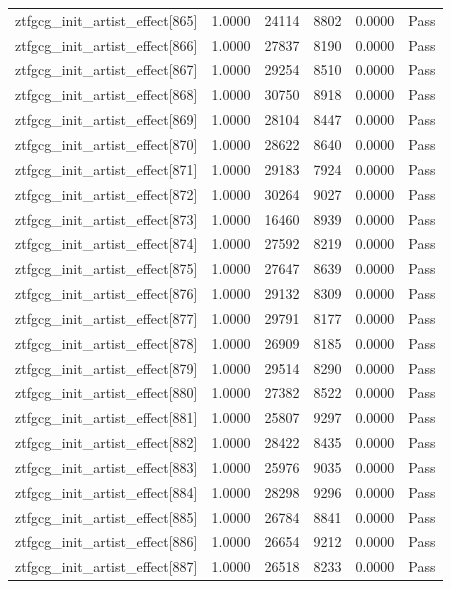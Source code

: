\begin{table}[htbp]
\begin{tabular}{llrrll}
ztfgcg\_init\_artist\_effect[865] & 1.0000 & 24114 & 8802 & 0.0000 & Pass \\
ztfgcg\_init\_artist\_effect[866] & 1.0000 & 27837 & 8190 & 0.0000 & Pass \\
ztfgcg\_init\_artist\_effect[867] & 1.0000 & 29254 & 8510 & 0.0000 & Pass \\
ztfgcg\_init\_artist\_effect[868] & 1.0000 & 30750 & 8918 & 0.0000 & Pass \\
ztfgcg\_init\_artist\_effect[869] & 1.0000 & 28104 & 8447 & 0.0000 & Pass \\
ztfgcg\_init\_artist\_effect[870] & 1.0000 & 28622 & 8640 & 0.0000 & Pass \\
ztfgcg\_init\_artist\_effect[871] & 1.0000 & 29183 & 7924 & 0.0000 & Pass \\
ztfgcg\_init\_artist\_effect[872] & 1.0000 & 30264 & 9027 & 0.0000 & Pass \\
ztfgcg\_init\_artist\_effect[873] & 1.0000 & 16460 & 8939 & 0.0000 & Pass \\
ztfgcg\_init\_artist\_effect[874] & 1.0000 & 27592 & 8219 & 0.0000 & Pass \\
ztfgcg\_init\_artist\_effect[875] & 1.0000 & 27647 & 8639 & 0.0000 & Pass \\
ztfgcg\_init\_artist\_effect[876] & 1.0000 & 29132 & 8309 & 0.0000 & Pass \\
ztfgcg\_init\_artist\_effect[877] & 1.0000 & 29791 & 8177 & 0.0000 & Pass \\
ztfgcg\_init\_artist\_effect[878] & 1.0000 & 26909 & 8185 & 0.0000 & Pass \\
ztfgcg\_init\_artist\_effect[879] & 1.0000 & 29514 & 8290 & 0.0000 & Pass \\
ztfgcg\_init\_artist\_effect[880] & 1.0000 & 27382 & 8522 & 0.0000 & Pass \\
ztfgcg\_init\_artist\_effect[881] & 1.0000 & 25807 & 9297 & 0.0000 & Pass \\
ztfgcg\_init\_artist\_effect[882] & 1.0000 & 28422 & 8435 & 0.0000 & Pass \\
ztfgcg\_init\_artist\_effect[883] & 1.0000 & 25976 & 9035 & 0.0000 & Pass \\
ztfgcg\_init\_artist\_effect[884] & 1.0000 & 28298 & 9296 & 0.0000 & Pass \\
ztfgcg\_init\_artist\_effect[885] & 1.0000 & 26784 & 8841 & 0.0000 & Pass \\
ztfgcg\_init\_artist\_effect[886] & 1.0000 & 26654 & 9212 & 0.0000 & Pass \\
ztfgcg\_init\_artist\_effect[887] & 1.0000 & 26518 & 8233 & 0.0000 & Pass \\

\end{tabular}
\end{table}
